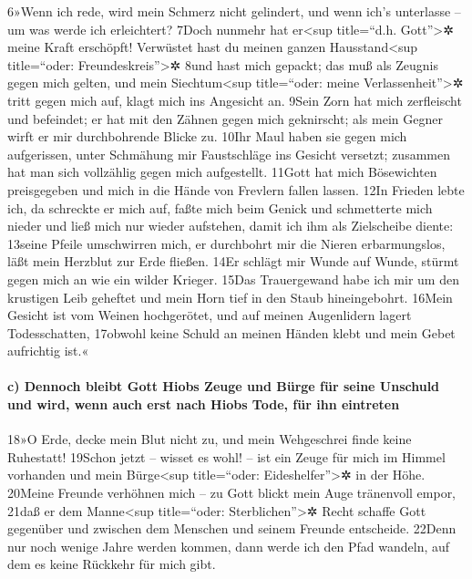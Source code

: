 6»Wenn ich rede, wird mein Schmerz nicht gelindert, und wenn ich's
unterlasse -- um was werde ich erleichtert? 7Doch nunmehr hat
er\textless sup title=``d.h. Gott''\textgreater✲ meine Kraft erschöpft!
Verwüstet hast du meinen ganzen Hausstand\textless sup title=``oder:
Freundeskreis''\textgreater✲ 8und hast mich gepackt; das muß als Zeugnis
gegen mich gelten, und mein Siechtum\textless sup title=``oder: meine
Verlassenheit''\textgreater✲ tritt gegen mich auf, klagt mich ins
Angesicht an. 9Sein Zorn hat mich zerfleischt und befeindet; er hat mit
den Zähnen gegen mich geknirscht; als mein Gegner wirft er mir
durchbohrende Blicke zu. 10Ihr Maul haben sie gegen mich aufgerissen,
unter Schmähung mir Faustschläge ins Gesicht versetzt; zusammen hat man
sich vollzählig gegen mich aufgestellt. 11Gott hat mich Bösewichten
preisgegeben und mich in die Hände von Frevlern fallen lassen. 12In
Frieden lebte ich, da schreckte er mich auf, faßte mich beim Genick und
schmetterte mich nieder und ließ mich nur wieder aufstehen, damit ich
ihm als Zielscheibe diente: 13seine Pfeile umschwirren mich, er
durchbohrt mir die Nieren erbarmungslos, läßt mein Herzblut zur Erde
fließen. 14Er schlägt mir Wunde auf Wunde, stürmt gegen mich an wie ein
wilder Krieger. 15Das Trauergewand habe ich mir um den krustigen Leib
geheftet und mein Horn tief in den Staub hineingebohrt. 16Mein Gesicht
ist vom Weinen hochgerötet, und auf meinen Augenlidern lagert
Todesschatten, 17obwohl keine Schuld an meinen Händen klebt und mein
Gebet aufrichtig ist.«

\hypertarget{c-dennoch-bleibt-gott-hiobs-zeuge-und-buxfcrge-fuxfcr-seine-unschuld-und-wird-wenn-auch-erst-nach-hiobs-tode-fuxfcr-ihn-eintreten}{%
\paragraph{c) Dennoch bleibt Gott Hiobs Zeuge und Bürge für seine
Unschuld und wird, wenn auch erst nach Hiobs Tode, für ihn
eintreten}\label{c-dennoch-bleibt-gott-hiobs-zeuge-und-buxfcrge-fuxfcr-seine-unschuld-und-wird-wenn-auch-erst-nach-hiobs-tode-fuxfcr-ihn-eintreten}}

18»O Erde, decke mein Blut nicht zu, und mein Wehgeschrei finde keine
Ruhestatt! 19Schon jetzt -- wisset es wohl! -- ist ein Zeuge für mich im
Himmel vorhanden und mein Bürge\textless sup title=``oder:
Eideshelfer''\textgreater✲ in der Höhe. 20Meine Freunde verhöhnen mich
-- zu Gott blickt mein Auge tränenvoll empor, 21daß er dem
Manne\textless sup title=``oder: Sterblichen''\textgreater✲ Recht
schaffe Gott gegenüber und zwischen dem Menschen und seinem Freunde
entscheide. 22Denn nur noch wenige Jahre werden kommen, dann werde ich
den Pfad wandeln, auf dem es keine Rückkehr für mich gibt.

